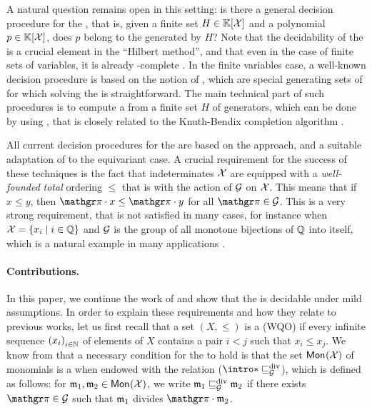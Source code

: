 \AP A natural question remains open in this setting: is there a general
decision procedure for the , that
is, given a finite set $H \in \mathbb{K}[\mathcal{X}]$ and a polynomial $p \in
\mathbb{K}[\mathcal{X}]$, does $p$ belong to the  generated by $H$?
Note that the decidability of the  is
a crucial element in the ``Hilbert method'', and that even in the case of
finite sets of variables, it is already \EXPTIME-complete \cite{MAME82}. In the
finite variables case, a well-known decision procedure is based on the notion
of , which are special generating sets of  for
which solving the  is straightforward. The main
technical part of such procedures is to compute a  from a
finite set $H$ of generators, which can be done by using  \cite{BUCH76}, that is closely related to the Knuth-Bendix
completion algorithm \cite{KNBEND70}.

\AP All current decision procedures for the  are based on the  approach, and a suitable
adaptation of  to the equivariant case. A crucial
requirement for the success of these techniques is the fact that indeterminates
$\mathcal{X}$ are equipped with a \emph{well-founded} \emph{total} ordering $\leq$ that
is  with the action of $\mathcal{G}$ on $\mathcal{X}$. This means that if
$x \leq y$, then $\gelem \cdot x \leq \gelem \cdot y$ for all $\gelem \in
\group$. This is a very strong requirement, that is not satisfied in many
cases, for instance when $\mathcal{X} = \{ x_i \mid i \in \mathbb{Q} \}$ and $\mathcal{G}$ is the group
of all monotone bijections of $\mathbb{Q}$ into itself, which is a natural example in
many applications \cite{BOKLMO24}.

\paragraph{Contributions.} \AP In this paper, we continue the work of
\cite{GHOLAS24} and show that the  is
decidable under mild assumptions. In order to explain these requirements and
how they relate to previous works, let us first recall that a set $(X, \leq)$ is a
 (WQO) if every infinite sequence $\seqof{x_i}[i \in
\N]$ of elements of $X$ contains a pair $i < j$ such that $x_i \leq x_j$.
We know from \cite{GHOLAS24} that a
necessary condition for the  to hold is
that the set  $\mathsf{Mon}_{}(\mathcal{X})$  of monomials is a
 when endowed with the  relation ($\intro*\gdivleq$), which is defined as follows: for
$\monelt_1, \monelt_2 \in \mon{\X}$, we write $\monelt_1 \gdivleq
\monelt_2$ if there exists $\gelem \in \group$ such that $\monelt_1$ divides
$\gelem \cdot \monelt_2$.


